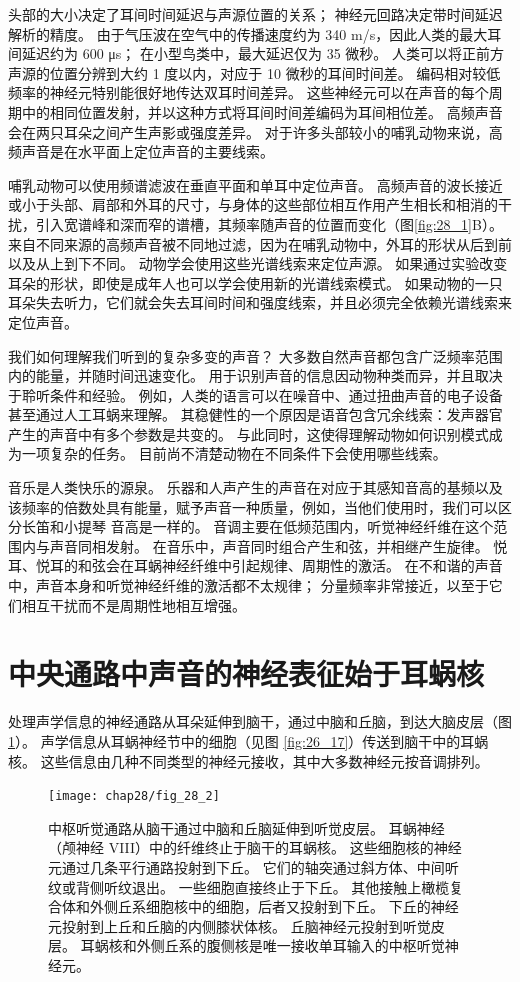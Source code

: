 头部的大小决定了耳间时间延迟与声源位置的关系； 神经元回路决定带时间延迟解析的精度。
由于气压波在空气中的传播速度约为 340 m/s，因此人类的最大耳间延迟约为 600 μs； 在小型鸟类中，最大延迟仅为 35 微秒。
人类可以将正前方声源的位置分辨到大约 1 度以内，对应于 10 微秒的耳间时间差。
编码相对较低频率的神经元特别能很好地传达双耳时间差异。
这些神经元可以在声音的每个周期中的相同位置发射，并以这种方式将耳间时间差编码为耳间相位差。
高频声音会在两只耳朵之间产生声影或强度差异。
对于许多头部较小的哺乳动物来说，高频声音是在水平面上定位声音的主要线索。


哺乳动物可以使用频谱滤波在垂直平面和单耳中定位声音。
高频声音的波长接近或小于头部、肩部和外耳的尺寸，与身体的这些部位相互作用产生相长和相消的干扰，引入宽谱峰和深而窄的谱槽，其频率随声音的位置而变化（图\ref{fig:28_1}B）。
来自不同来源的高频声音被不同地过滤，因为在哺乳动物中，外耳的形状从后到前以及从上到下不同。
动物学会使用这些光谱线索来定位声源。
如果通过实验改变耳朵的形状，即使是成年人也可以学会使用新的光谱线索模式。
如果动物的一只耳朵失去听力，它们就会失去耳间时间和强度线索，并且必须完全依赖光谱线索来定位声音。


我们如何理解我们听到的复杂多变的声音？
大多数自然声音都包含广泛频率范围内的能量，并随时间迅速变化。
用于识别声音的信息因动物种类而异，并且取决于聆听条件和经验。
例如，人类的语言可以在噪音中、通过扭曲声音的电子设备甚至通过人工耳蜗来理解。
其稳健性的一个原因是语音包含冗余线索：发声器官产生的声音中有多个参数是共变的。
与此同时，这使得理解动物如何识别模式成为一项复杂的任务。
目前尚不清楚动物在不同条件下会使用哪些线索。


音乐是人类快乐的源泉。
乐器和人声产生的声音在对应于其感知音高的基频以及该频率的倍数处具有能量，赋予声音一种质量，例如，当他们使用时，我们可以区分长笛和小提琴 音高是一样的。
音调主要在低频范围内，听觉神经纤维在这个范围内与声音同相发射。
在音乐中，声音同时组合产生和弦，并相继产生旋律。
悦耳、悦耳的和弦会在耳蜗神经纤维中引起规律、周期性的激活。
在不和谐的声音中，声音本身和听觉神经纤维的激活都不太规律；
分量频率非常接近，以至于它们相互干扰而不是周期性地相互增强。


\section{中央通路中声音的神经表征始于耳蜗核}
处理声学信息的神经通路从耳朵延伸到脑干，通过中脑和丘脑，到达大脑皮层（图 \ref{fig:28_2}）。
声学信息从耳蜗神经节中的细胞（见图 \ref{fig:26_17}）传送到脑干中的耳蜗核。
这些信息由几种不同类型的神经元接收，其中大多数神经元按音调排列。


\begin{figure}[htbp]
	\centering
	\texttt{[image: chap28/fig\_28\_2]}
	\caption{中枢听觉通路从脑干通过中脑和丘脑延伸到听觉皮层。
		耳蜗神经（颅神经 VIII）中的纤维终止于脑干的耳蜗核。
		这些细胞核的神经元通过几条平行通路投射到下丘。
		它们的轴突通过斜方体、中间听纹或背侧听纹退出。
		一些细胞直接终止于下丘。
		其他接触上橄榄复合体和外侧丘系细胞核中的细胞，后者又投射到下丘。
		下丘的神经元投射到上丘和丘脑的内侧膝状体核。
		丘脑神经元投射到听觉皮层。
		耳蜗核和外侧丘系的腹侧核是唯一接收单耳输入的中枢听觉神经元。}
	\label{fig:28_2}
\end{figure}


